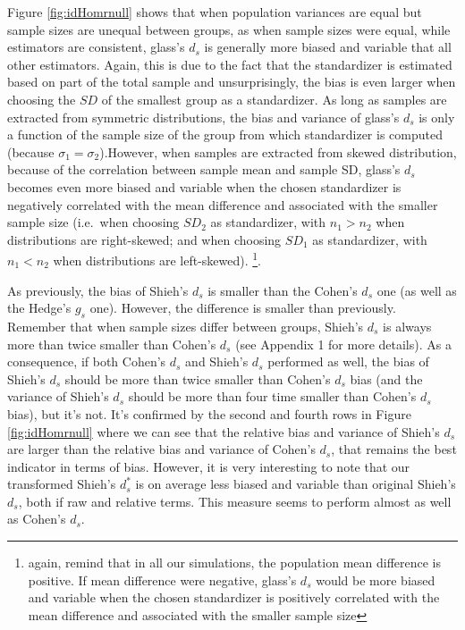 \documentclass[
  man,floatsintext]{apa6}
\begin{document}
Figure \ref{fig:idHomrnull} shows that when population variances are equal but sample sizes are unequal between groups, as when sample sizes were equal, while estimators are consistent, glass's \(d_s\) is generally more biased and variable that all other estimators. Again, this is due to the fact that the standardizer is estimated based on part of the total sample and unsurprisingly, the bias is even larger when choosing the \(SD\) of the smallest group as a standardizer. As long as samples are extracted from symmetric distributions, the bias and variance of glass's \(d_s\) is only a function of the sample size of the group from which standardizer is computed (because \(\sigma_1=\sigma_2\)).However, when samples are extracted from skewed distribution, because of the correlation between sample mean and sample SD, glass's \(d_s\) becomes even more biased and variable when the chosen standardizer is negatively correlated with the mean difference and associated with the smaller sample size (i.e.~when choosing \(SD_2\) as standardizer, with \(n_1 > n_2\) when distributions are right-skewed; and when choosing \(SD_1\) as standardizer, with \(n_1 < n_2\) when distributions are left-skewed). \footnote{again, remind that in all our simulations, the population mean difference is positive. If mean difference were negative, glass's $d_s$ would be more biased and variable when the chosen standardizer is positively correlated with the mean difference and associated with the smaller sample size}.

As previously, the bias of Shieh's \(d_s\) is smaller than the Cohen's \(d_s\) one (as well as the Hedge's \(g_s\) one). However, the difference is smaller than previously. Remember that when sample sizes differ between groups, Shieh's \(d_s\) is always more than twice smaller than Cohen's \(d_s\) (see Appendix 1 for more details). As a consequence, if both Cohen's \(d_s\) and Shieh's \(d_s\) performed as well, the bias of Shieh's \(d_s\) should be more than twice smaller than Cohen's \(d_s\) bias (and the variance of Shieh's \(d_s\) should be more than four time smaller than Cohen's \(d_s\) bias), but it's not. It's confirmed by the second and fourth rows in Figure \ref{fig:idHomrnull} where we can see that the relative bias and variance of Shieh's \(d_s\) are larger than the relative bias and variance of Cohen's \(d_s\), that remains the best indicator in terms of bias. However, it is very interesting to note that our transformed Shieh's \(d^*_s\) is on average less biased and variable than original Shieh's \(d_s\), both if raw and relative terms. This measure seems to perform almost as well as Cohen's \(d_s\).
\end{document}
